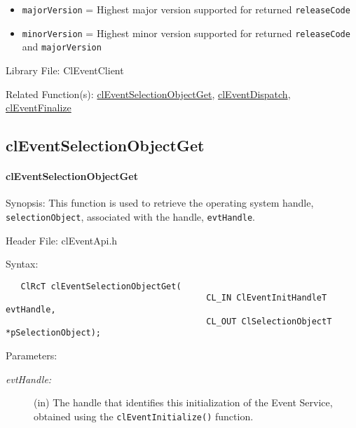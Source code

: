 \begin{flushleft}
\begin{Desc}
\begin{itemize}
\item
{\tt{majorVersion}} = Highest major version supported for returned {\tt{releaseCode}}
\item
{\tt{minorVersion}} = Highest minor version supported for returned {\tt{releaseCode}} and {\tt{majorVersion}}
\end{itemize}
\end{Desc}
\begin{Desc}
\item[Library File:]Cl\-Event\-Client\end{Desc}
\begin{Desc}
\item[Related Function(s):]\hyperlink{pageem117}{cl\-Event\-Selection\-Object\-Get}, \hyperlink{pageem118}{cl\-Event\-Dispatch}, 
\hyperlink{pageem102}{cl\-Event\-Finalize} \end{Desc}
\newpage


\subsection{clEventSelectionObjectGet}
\hypertarget{pageem117}{}\paragraph{cl\-Event\-Selection\-Object\-Get}\label{pageem117}
\begin{Desc}
\item[Synopsis:] This function is used to retrieve the operating system handle, {\tt{selectionObject}}, associated with the handle, {\tt{evtHandle}}. 
\end{Desc}
\begin{Desc}
\item[Header File:]clEventApi.h\end{Desc}
\begin{Desc}
\item[Syntax:]

\footnotesize\begin{verbatim}   ClRcT clEventSelectionObjectGet(
              							CL_IN ClEventInitHandleT evtHandle,
			                			CL_OUT ClSelectionObjectT *pSelectionObject);
\end{verbatim}
\normalsize
\end{Desc}
\begin{Desc}
\item[Parameters:]
\begin{description}
\item[{\em evt\-Handle:}](in) The handle that identifies this initialization of the Event Service, obtained using the {\tt{clEventInitialize()}} function.


\end{description}
\end{Desc}
\end{flushleft}
